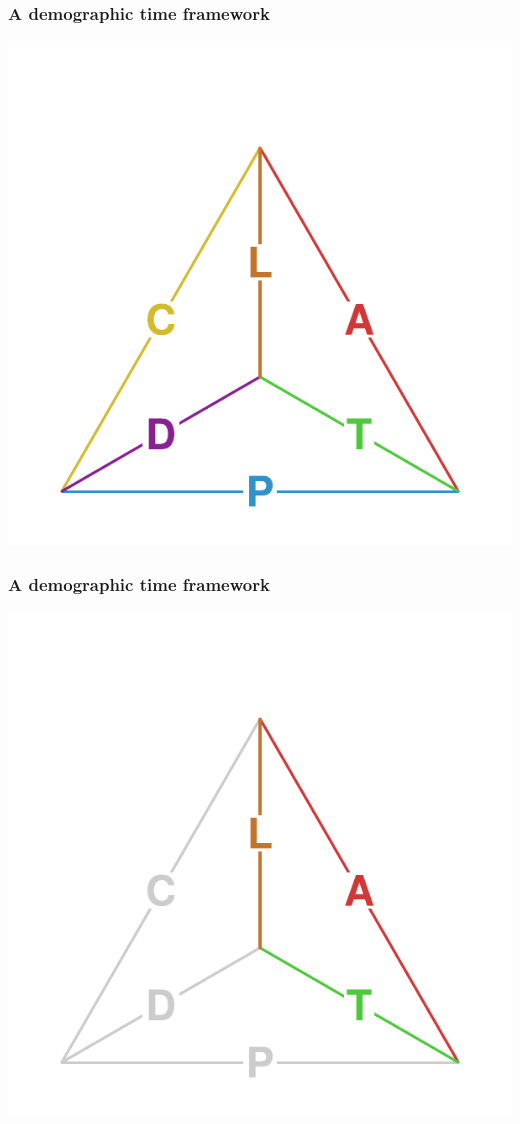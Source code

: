 \documentclass[20pt]{beamer}
\begin{document}
\begin{frame}
\frametitle{A demographic time framework}
\centering
\vspace{-3em}
\includegraphics[scale=1.5]{Figures/TetraHedronEdgesOnly.pdf}\\
\end{frame}

\begin{frame}
\frametitle{A demographic time framework}
\centering
\vspace{-3em}
\includegraphics[scale=1.5]{Figures/TetraHedronEdgesOnlyTAL.pdf}\\
\end{frame}
\end{document}
